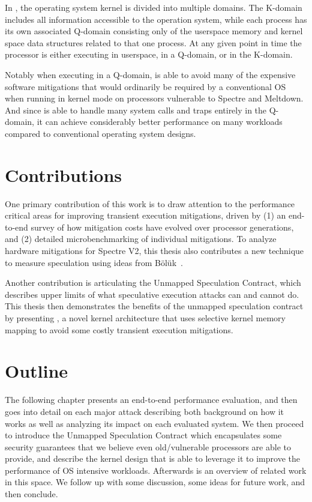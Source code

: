 In \sys, the operating system kernel is divided into multiple domains.
The K-domain includes all information accessible to the operation system, while each process has its own associated Q-domain consisting only of the userspace memory and kernel space data structures related to that one process.
At any given point in time the processor is either executing in userspace, in a Q-domain, or in the K-domain. 

Notably when executing in a Q-domain, \sys is able to avoid many of the expensive software mitigations that would ordinarily be required by a conventional OS when running in kernel mode on processors vulnerable to Spectre and Meltdown.
And since \sys is able to handle many system calls and traps entirely in the Q-domain, it can achieve considerably better performance on many workloads compared to conventional operating system designs.

\section{Contributions}

One primary contribution of this work is to draw attention to the
performance critical areas for improving transient execution
mitigations, driven by (1) an end-to-end survey of how mitigation
costs have evolved over processor generations, and (2) detailed
microbenchmarking of individual mitigations.  To analyze hardware
mitigations for Spectre V2, this thesis also contributes a new technique to measure
speculation using ideas from Bölük~\cite{speculating-x86}.

Another contribution is articulating the Unmapped Speculation Contract, which describes upper limits of what speculative execution attacks can and cannot do.
This thesis then demonstrates the benefits of the unmapped speculation contract
by presenting \sys{}, a novel kernel architecture that uses
selective kernel memory mapping to avoid some costly transient execution
mitigations.

\section{Outline}
The following chapter presents an end-to-end performance evaluation, and then goes into detail on each major attack describing both background on how it works as well as analyzing its impact on each evaluated system.
We then proceed to introduce the Unmapped Speculation Contract which encapsulates some security guarantees that we believe even old/vulnerable processors are able to provide, and describe the \sys kernel design that is able to leverage it to improve the performance of OS intensive workloads.
Afterwards is an overview of related work in this space.
We follow up with some discussion, some ideas for future work, and then conclude.
